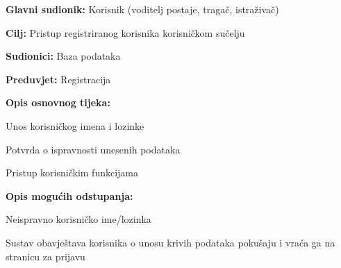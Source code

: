 					\noindent {}
					\begin{packed_item}
	
						\item \textbf{Glavni sudionik: }Korisnik (voditelj postaje, tragač, istraživač)
						\item  \textbf{Cilj:} Pristup registriranog korisnika korisničkom sučelju
						\item  \textbf{Sudionici:} Baza podataka
						\item  \textbf{Preduvjet:} Registracija
						\item  \textbf{Opis osnovnog tijeka:} 
						
						
						\item[] \begin{packed_enum}
	
							\item Unos korisničkog imena i lozinke							
							\item Potvrda o ispravnosti unesenih podataka
							\item Pristup korisničkim funkcijama
							
						\end{packed_enum}
						
						\item  \textbf{Opis mogućih odstupanja:}
						
						\item[] \begin{packed_item}
	
							\item[2.a] Neispravno korisničko ime/lozinka
							\item[] \begin{packed_enum}
								
								\item Sustav obavještava korisnika o unosu krivih podataka pokušaju i vraća ga na stranicu za prijavu 
								
							\end{packed_enum}
							
						\end{packed_item}
					\end{packed_item}
					


